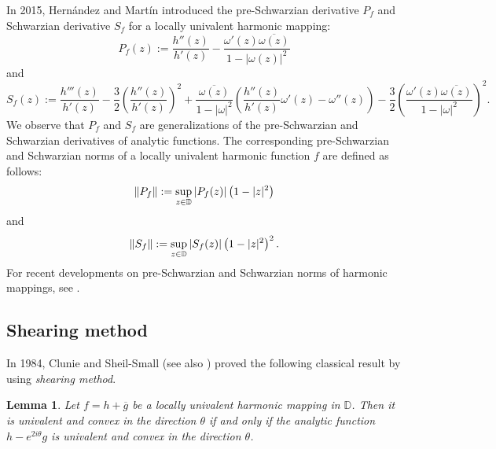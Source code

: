 \documentclass[11pt, reqno]{amsart}
\newtheorem{lemma}{Lemma}
\numberwithin{equation}{section}
\newcommand{\D}{\mbox{$\mathbb{D}$}}
\begin{document}
In 2015, Hern\'andez and Mart\'in \cite{hm2} introduced the pre-Schwarzian derivative $P_f$ and Schwarzian derivative $S_f$ for a locally univalent harmonic mapping:
\begin{equation*}\label{9}
       P_f(z):=\dfrac{h''(z)}{h'(z)}-\dfrac{\omega'(z)\overline {\omega(z)}}{1-|\omega(z)|^2}
\end{equation*}
and
\begin{equation*}\label{10}
 S_f(z):=\dfrac{h'''(z)}{h'(z)}-\dfrac{3}{2}\left(\dfrac{h''(z)}{h'(z)}\right)^2
 +\dfrac{\overline {\omega(z)}}{1-|\omega|^2}\left(\dfrac{h''(z)}{h'(z)}\omega'(z)-\omega''(z)\right)-\dfrac{3}{2}\left(\dfrac{\omega'(z)\overline {\omega(z)}}{1-|\omega|^2}\right)^2.
 \end{equation*}   
We observe that $P_f$ and $S_f$ are generalizations of the pre-Schwarzian and Schwarzian derivatives of analytic functions.
 The corresponding pre-Schwarzian and Schwarzian norms of a locally univalent harmonic function $f$ are defined as follows:
 \begin{equation*}\label{11}
     \|P_f\|:=\sup_{z\in{\scriptsize \D}}|P_f(z)|\left(1-|z|^2\right)
 \end{equation*} and
 \begin{equation*}\label{12}
     \|S_f\|:=\sup_{z\in{\scriptsize \D}}|S_f(z)|\left(1-|z|^2\right)^2.
 \end{equation*}
For recent developments on pre-Schwarzian and Schwarzian norms of harmonic mappings, see \cite{
cp,chm,g2,%
wwrq}.







\subsection{Shearing method}
In 1984, Clunie and Sheil-Small \cite{cs} (see also \cite{du}) proved the following classical result by using \textit{shearing method}.
\begin{lemma}\label{lem1}
Let $f=h+\overline{g}$ be a locally univalent harmonic mapping in $\D$. Then it is univalent and convex in the  direction $\theta$ if and only if the analytic function $h-e^{2i\theta}g$ is univalent and convex in the direction $\theta$. 
\end{lemma}
    
\end{document}
